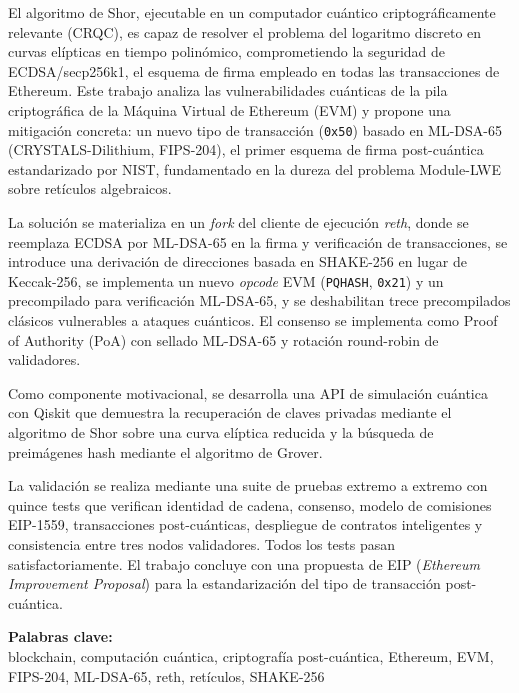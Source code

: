 El algoritmo de Shor, ejecutable en un computador cuántico criptográficamente relevante (CRQC), es capaz de resolver el problema del logaritmo discreto en curvas elípticas en tiempo polinómico, comprometiendo la seguridad de ECDSA/secp256k1, el esquema de firma empleado en todas las transacciones de Ethereum. Este trabajo analiza las vulnerabilidades cuánticas de la pila criptográfica de la Máquina Virtual de Ethereum (EVM) y propone una mitigación concreta: un nuevo tipo de transacción (\texttt{0x50}) basado en ML-DSA-65 (CRYSTALS-Dilithium, FIPS-204), el primer esquema de firma post-cuántica estandarizado por NIST, fundamentado en la dureza del problema Module-LWE sobre retículos algebraicos.

La solución se materializa en un \emph{fork} del cliente de ejecución \emph{reth}, donde se reemplaza ECDSA por ML-DSA-65 en la firma y verificación de transacciones, se introduce una derivación de direcciones basada en SHAKE-256 en lugar de Keccak-256, se implementa un nuevo \emph{opcode} EVM (\texttt{PQHASH}, \texttt{0x21}) y un precompilado para verificación ML-DSA-65, y se deshabilitan trece precompilados clásicos vulnerables a ataques cuánticos. El consenso se implementa como Proof of Authority (PoA) con sellado ML-DSA-65 y rotación round-robin de validadores.

Como componente motivacional, se desarrolla una API de simulación cuántica con Qiskit que demuestra la recuperación de claves privadas mediante el algoritmo de Shor sobre una curva elíptica reducida y la búsqueda de preimágenes hash mediante el algoritmo de Grover.

La validación se realiza mediante una suite de pruebas extremo a extremo con quince tests que verifican identidad de cadena, consenso, modelo de comisiones EIP-1559, transacciones post-cuánticas, despliegue de contratos inteligentes y consistencia entre tres nodos validadores. Todos los tests pasan satisfactoriamente. El trabajo concluye con una propuesta de EIP (\emph{Ethereum Improvement Proposal}) para la estandarización del tipo de transacción post-cuántica.

\vspace*{4\baselineskip}
\textbf{Palabras clave:}\\
blockchain, computación cuántica, criptografía post-cuántica, Ethereum, EVM, FIPS-204, ML-DSA-65, reth, retículos, SHAKE-256
